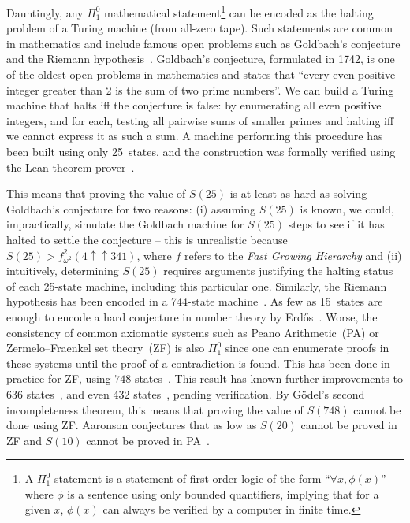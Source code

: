 \documentclass[sigconf,screen]{acmart}
\theoremstyle{definition} %
\numberwithin{equation}{section}
\theoremstyle{definition} %
\begin{document}
Dauntingly, any $\Pi_1^0$ mathematical statement\footnote{A $\Pi_1^0$ statement is a statement of first-order logic of the form ``$\forall x, \phi(x)$'' where $\phi$ is a sentence using only bounded quantifiers, implying that for a given $x$, $\phi(x)$ can always be verified by a computer in finite time.} can be encoded as the halting problem of a Turing machine (from all-zero tape). Such statements are common in mathematics and include famous open problems such as Goldbach's conjecture and the Riemann hypothesis~\cite{Davis-Matiyasevich-Robinson-1976}. Goldbach's conjecture, formulated in 1742, is one of the oldest open problems in mathematics and states that ``every even positive integer greater than 2 is the sum of two prime numbers''. We can build a Turing machine that halts iff the conjecture is false: by enumerating all even positive integers, and for each, testing all pairwise sums of smaller primes and halting iff we cannot express it as such a sum. A machine performing this procedure has been built using only 25~states, and the construction was formally verified using the Lean theorem prover~\cite{GoldbachTM27,GoldbachTM25,DeMouraKongAvigadVanDoornvonRaumer}.


This means that proving the value of $S(25)$ is at least as hard as solving Goldbach's conjecture for two reasons: (i) assuming $S(25)$ is known, we could, impractically, simulate the Goldbach machine for $S(25)$ steps to see if it has halted to settle the conjecture -- this is unrealistic because $S(25) > f^2_{\omega^2}(4 \uparrow \uparrow 341)$, where $f$ refers to the \textit{Fast Growing Hierarchy} \cite{wikiChampions,wainer1970classification} and (ii) intuitively, determining $S(25)$ requires arguments justifying the halting status of each 25-state machine, including this particular one. Similarly, the Riemann hypothesis has been encoded in a 744-state machine~\cite{RiemannTM,Yedidia2016}. As few as 15~states are enough to encode a hard conjecture in number theory by Erd\H{o}s~\cite{BB15}. Worse, the consistency of common axiomatic systems such as Peano Arithmetic~(PA) or Zermelo--Fraenkel set theory~(ZF) is also $\Pi_1^0$ since one can enumerate proofs in these systems until the proof of a contradiction is found. This has been done in practice for ZF, using $748$ states~\cite{BB748Thesis,Yedidia2016,BusyBeaverFrontier}. This result has known further improvements to 636 states~\cite{RidenourZF636}, and even 432 states~\cite{wade2025alignment}, pending verification. By G\"odel's second incompleteness theorem, this means that proving the value of $S(748)$ cannot be done using ZF. Aaronson conjectures that as low as $S(20)$ cannot be proved in ZF and $S(10)$ cannot be proved in PA~\cite{BusyBeaverFrontier}.
\end{document}
